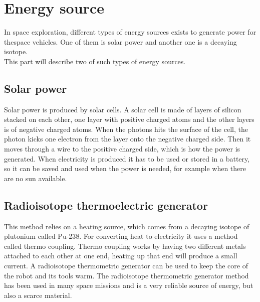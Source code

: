 \section{Energy source}

In space exploration, different types of energy sources exists to generate power for thespace vehicles. One of them is solar power and another one is a decaying isotope.\\
This part will describe two of such types of energy sources.

\subsection{Solar power}
Solar power is produced by solar cells. A solar cell is made of layers of silicon stacked on each other, one layer with positive charged atoms and the other layers is of negative charged atoms.  When the photons hits the surface of the cell, the photon kicks one electron from the layer onto the negative charged side. Then it moves through a wire to the positive charged side, which is how the power is generated. When electricity is produced it has to be used or stored in a battery, so it can be saved and used when the power is needed, for example when there are no sun available.

\subsection{Radioisotope thermoelectric generator}\label{Rtg}
This method relies on a heating source, which comes from a decaying isotope of plutonium called Pu-238. For converting heat to electricity it uses a method called thermo coupling. Thermo coupling works by having two different metals attached to each other at one end, heating up that end will produce a small current.
A radioisotope thermometric generator can be used to keep the core of the robot and its tools warm. The radioisotope thermometric generator method has been used in many space missions and is a very reliable source of energy, but also a scarce material\cite{RTG}.


